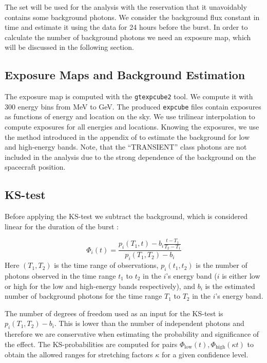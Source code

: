 \documentclass{article}
\begin{document}
The set will be used for the analysis with the reservation that it
unavoidably contains some background photons. We consider the
background flux constant in time and estimate it using the data for 24
hours before the burst. In order to calculate the number of background
photons we need an exposure map, which will be discussed in the
following section.

\subsection{Exposure Maps and Background Estimation}

The exposure map is computed with the \texttt{gtexpcube2} tool. We
compute it with 300 energy bins from \unit[100]{MeV} to
\unit[300]{GeV}. The produced \texttt{expcube} files contain exposures
as functions of energy and location on the sky. We use trilinear
interpolation to compute exposures for all energies and
locations. Knowing the exposures, we use the method introduced in the
appendix of \cite{Rubtsov:2011qq} to estimate the background for low
and high-energy bands. Note, that the ``TRANSIENT'' class photons are
not included in the analysis due to the strong dependence of the
background on the spacecraft position.

\subsection{KS-test}

Before applying the KS-test we subtract the background, which is
considered linear for the duration of the burst :

\begin{equation}
	\Phi_i\left(t\right) = \frac{p_i\left(T_1, t\right) - b_i \frac{t-T_1}{T_2-T_1}}{p_i\left(T_1, T_2\right) - b_i}
\end{equation}
Here $\left(T_1, T_2\right)$ is the time range of observations,
$p_i\left(t_1, t_2\right)$ is the number of photons observed in the
time range $t_1$ to $t_2$ in the $i$'s energy band ($i$ is either low
or high for the low and high-energy bands respectively), and $b_i$ is
the estimated number of background photons for the time range $T_1$ to
$T_2$ in the $i$'s energy band.

The number of degrees of freedom used as an input for the KS-test is
$p_i\left(T_1, T_2\right) - b_i$. This is lower than the number of
independent photons and therefore we are conservative when estimating
the probability and significance of the effect. The KS-probabilities
are computed for pairs $\Phi_\text{low}\left(t\right),
\Phi_\text{high}\left(\kappa t\right)$ to obtain the allowed ranges
for stretching factors $\kappa$ for a given confidence level.
\end{document}
